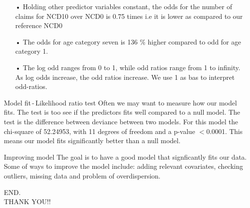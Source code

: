 \documentclass[11pt]{beamer}
\begin{document}
\begin{frame}
\begin{itemize}
\item[•]Holding other predictor variables constant, the odds for the number of claims for NCD10 over NCD0 is 0.75 times i.e it is lower as compared to our reference NCD0
\item[•]The odds for age category seven is 136 \%  higher compared to odd for age category 1.
\item[•]The log odd ranges from 0 to 1, while odd ratios range from 1 to infinity. As log odds increase, the odd ratios increase. We use 1 as bas to interpret odd-ratios.
\end{itemize}
\end{frame}
\begin{frame}{Model fit\,-\,Likelihood ratio test}
Often we may want to measure how our model fits. The test is too see if the predictors fits well compared to a null model. The test is the difference between deviance between two models.
For this model the chi-square of 52.24953, with 11 degrees of freedom and a p-value $<$0.0001. This means our model fits significantly better than a null model.
\end{frame}
\begin{frame}{Improving model}
The goal is to have a good model that signficantly fits our data. Some of ways to improve the model include: adding relevant  covariates, checking outliers, missing data and problem of  overdispersion.
\end{frame}
\begin{frame}
\centering
\huge{END.}\\
THANK YOU!!
\end{frame}
\cite{newtest}
 

\end{document}
